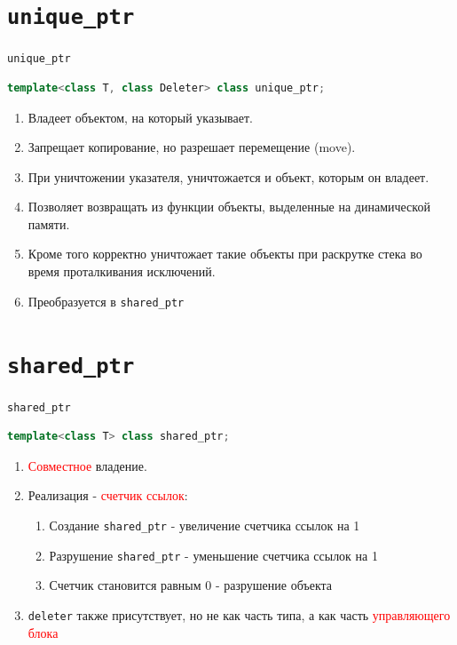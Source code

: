 \documentclass[10pt]{beamer}
\begin{document}
\section{\texttt{unique\_ptr}}
\begin{frame}[fragile]{\texttt{unique\_ptr}}
\begin{lstlisting}[language=C++]    
    template<class T, class Deleter> class unique_ptr;
\end{lstlisting}

\begin{enumerate}
    \item Владеет объектом, на который указывает.
    \item Запрещает копирование, но разрешает перемещение (move). 
    \item При уничтожении указателя, уничтожается и объект, которым он владеет. 
    \item Позволяет возвращать из функции объекты, выделенные на динамической памяти.
    \item Кроме того корректно уничтожает такие объекты при раскрутке стека во время проталкивания исключений.
    \item Преобразуется в \texttt{shared\_ptr}
\end{enumerate}
\end{frame}

\section{\texttt{shared\_ptr}}
\begin{frame}[fragile]{\texttt{shared\_ptr}}
\begin{lstlisting}[language=C++]
    template<class T> class shared_ptr;
\end{lstlisting}

\begin{enumerate}
    \item \textcolor{red}{Совместное} владение.
    \item Реализация - \textcolor{red}{счетчик ссылок}:
    \begin{enumerate}
        \item Создание \texttt{shared\_ptr} - увеличение счетчика ссылок на 1
        \item Разрушение \texttt{shared\_ptr} - уменьшение счетчика ссылок на 1
        \item Счетчик становится равным 0 - разрушение объекта
    \end{enumerate}
    \item \texttt{deleter} также присутствует, но не как часть типа, а как часть \textcolor{red}{управляющего блока}
\end{enumerate}
\end{frame}
\end{document}
